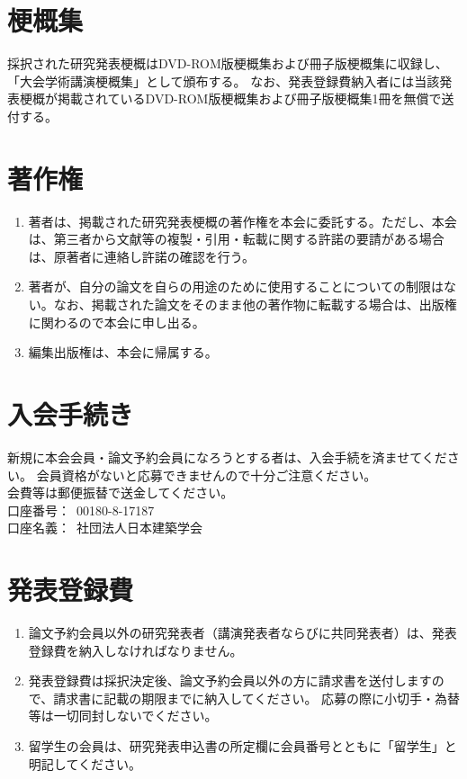 \documentclass[base=10pt,magstyle=real,a4paper,twocolumn,xelatex,pandoc,jafont=ms]{bxjsarticle}
\renewcommand{\theenumi}{\alph{enumi}}
\renewcommand{\labelenumi}{\theenumi.}
\begin{document}
\section{梗概集}
	採択された研究発表梗概はDVD-ROM版梗概集および冊子版梗概集に収録し、「大会学術講演梗概集」として頒布する。
	なお、発表登録費納入者には当該発表梗概が掲載されているDVD-ROM版梗概集および冊子版梗概集1冊を無償で送付する。
	
\section{著作権}
	\begin{enumerate}
		\renewcommand{\theenumi}{\arabic{enumi}}
		\renewcommand{\labelenumi}{(\theenumi)}
		\item 著者は、掲載された研究発表梗概の著作権を本会に委託する。ただし、本会は、第三者から文献等の複製・引用・転載に関する許諾の要請がある場合は、原著者に連絡し許諾の確認を行う。
		\item 著者が、自分の論文を自らの用途のために使用することについての制限はない。なお、掲載された論文をそのまま他の著作物に転載する場合は、出版権に関わるので本会に申し出る。
		\item 編集出版権は、本会に帰属する。
	\end{enumerate}


\section{入会手続き}
新規に本会会員・論文予約会員になろうとする者は、入会手続を済ませてください。
会員資格がないと応募できませんので十分ご注意ください。\\
会費等は郵便振替で送金してください。\\
口座番号：~00180-8-17187\\
口座名義：~社団法人日本建築学会

\section{発表登録費}
	\begin{enumerate}
		\item 論文予約会員以外の研究発表者（講演発表者ならびに共同発表者）は、発表登録費を納入しなければなりません。
		\item 発表登録費は採択決定後、論文予約会員以外の方に請求書を送付しますので、請求書に記載の期限までに納入してください。
		応募の際に小切手・為替等は一切同封しないでください。
		\item 留学生の会員は、研究発表申込書の所定欄に会員番号とともに「留学生」と明記してください。
	\end{enumerate}
\end{document}
